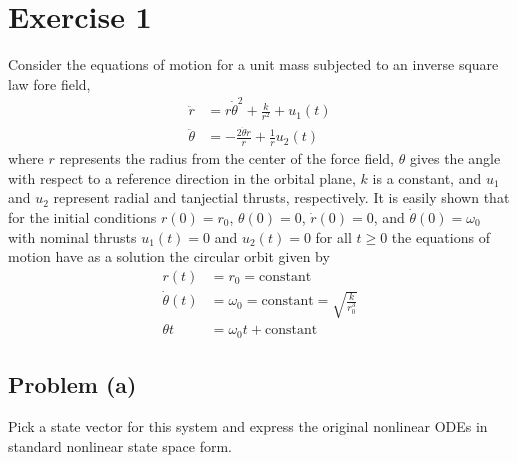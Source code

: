 \documentclass[11pt]{article}
\begin{document}
\thispagestyle{empty}

\newlength{\boxlength}\setlength{\boxlength}{\textwidth}
\addtolength{\boxlength}{-4mm}

\begin{center}
\end{center}

\section*{Exercise 1}
Consider the equations of motion for a unit mass subjected to an inverse square law fore field,
\begin{align*}
	\ddot{r} &= r \dot{\theta}^2 + \frac{k}{r^2} + u_1(t) \\
	\ddot{\theta} &= -\frac{2\dot{\theta}\dot{r}}{r} + \frac{1}{r}u_2(t)
\end{align*}
where $r$ represents the radius from the center of the force field, $\theta$ gives the angle with respect to a reference direction in the orbital plane, $k$ is a constant, and $u_1$ and $u_2$ represent radial and tanjectial thrusts, respectively. It is easily shown that for the initial conditions $r(0) = r_0$, $\theta(0) = 0$, $\dot{r}(0) = 0$, and $\dot{\theta}(0) = \omega_0$ with nominal thrusts $u_1(t) = 0$ and $u_2(t) = 0$ for all $t \geq 0$ the equations of motion have as a solution the circular orbit given by
\begin{align*}
	r(t) &= r_0 = \text{constant} \\
	\dot{\theta}(t) &= \omega_0 = \text{constant} = \sqrt{\frac{k}{r_0^3}} \\
	\theta{t} &= \omega_0t + \text{constant}
\end{align*}
\subsection*{Problem (a)}
Pick a state vector for this system and express the original nonlinear ODEs in standard nonlinear state space form.
\end{document}
